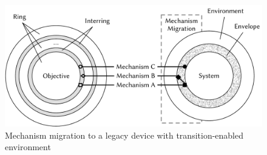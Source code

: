 






\begin{figure}
    \centering
    \includegraphics[width=\linewidth]{figures/MechanismMigration.pdf}
    \caption{Mechanism migration to a legacy device with transition-enabled environment}
    \label{fig:bigpicture}
\end{figure}

